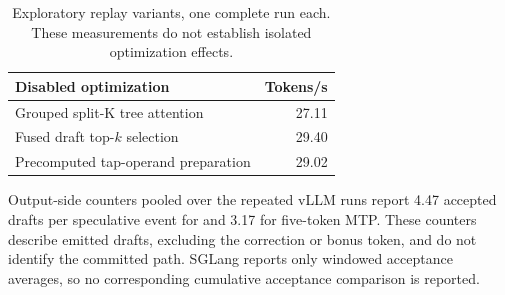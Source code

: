 \begin{table}[t]
\caption{Exploratory replay variants, one complete run each. These measurements do not establish isolated optimization effects.}
\label{tab:replay-variants}
\centering\small
\begin{tabular}{@{}lr@{}}
\toprule
Disabled optimization & Tokens/s \\
\midrule
Grouped split-K tree attention & 27.11 \\
Fused draft top-$k$ selection & 29.40 \\
Precomputed tap-operand preparation & 29.02 \\
\bottomrule
\end{tabular}
\end{table}

Output-side counters pooled over the repeated vLLM runs report 4.47 accepted drafts per speculative event for \sys{} and 3.17 for five-token MTP. These counters describe emitted drafts, excluding the correction or bonus token, and do not identify the committed path. SGLang reports only windowed acceptance averages, so no corresponding cumulative acceptance comparison is reported.
